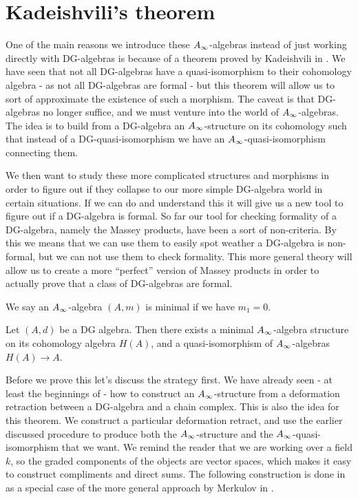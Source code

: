 

\section{Kadeishvili's theorem}

One of the main reasons we introduce these $A_{\infty}$-algebras instead of just working directly with DG-algebras is because of a theorem proved by Kadeishvili in \cite{kadeishvili}. We have seen that not all DG-algebras have a quasi-isomorphism to their cohomology algebra - as not all DG-algebras are formal - but this theorem will allow us to sort of approximate the existence of such a morphism. The caveat is that DG-algebras no longer suffice, and we must venture into the world of $A_{\infty}$-algebras. The idea is to build from a DG-algebra an $A_{\infty}$-structure on its cohomology such that instead of a DG-quasi-isomorphism we have an $A_{\infty}$-quasi-isomorphism connecting them. 

We then want to study these more complicated structures and morphisms in order to figure out if they collapse to our more simple DG-algebra world in certain situations. If we can do and understand this it will give us a new tool to figure out if a DG-algebra is formal. So far our tool for checking formality of a DG-algebra, namely the Massey products, have been a sort of non-criteria. By this we means that we can use them to easily spot weather a DG-algebra is non-formal, but we can not use them to check formality. This more general theory will allow us to create a more ``perfect'' version of Massey products in order to actually prove that a class of DG-algebras are formal. 

\begin{definition}
We say an $A_{\infty}$-algebra $(A, m)$ is minimal if we have $m_1 = 0$. 
\end{definition}

\begin{theorem}
Let $(A,d)$ be a DG algebra. Then there exists a minimal $A_{\infty}$-algebra structure on its cohomology algebra $H(A)$, and a quasi-isomorphism of $A_{\infty}$-algebras $H(A)\rightarrow A$. 
\end{theorem}

Before we prove this let's discuss the strategy first. We have already seen - at least the beginnings of - how to construct an $A_{\infty}$-structure from a deformation retraction between a DG-algebra and a chain complex. This is also the idea for this theorem. We construct a particular deformation retract, and use the earlier discussed procedure to produce both the $A_{\infty}$-structure and the $A_{\infty}$-quasi-isomorphism that we want. We remind the reader that we are working over a field $k$, so the graded components of the objects are vector spaces, which makes it easy to construct compliments and direct sums. The following construction is done in \cite{Ext} as a special case of the more general approach by Merkulov in \cite{Merkulov}. 

